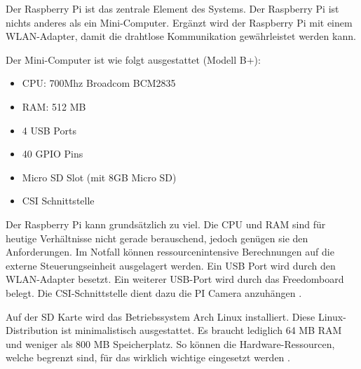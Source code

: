 Der Raspberry Pi ist das zentrale Element des Systems. Der Raspberry Pi ist nichts anderes als ein Mini-Computer. Ergänzt wird der Raspberry Pi mit einem WLAN-Adapter, damit die drahtlose Kommunikation gewährleistet werden kann.

Der Mini-Computer ist wie folgt ausgestattet (Modell B+):
\begin{itemize}
	\item CPU: 700Mhz Broadcom BCM2835
	\item RAM: 512 MB
	\item 4 USB Ports
	\item 40 GPIO Pins
	\item Micro SD Slot (mit 8GB Micro SD)
	\item CSI Schnittstelle
\end{itemize}

Der Raspberry Pi kann grundsätzlich zu viel. Die CPU und RAM sind für heutige Verhältnisse nicht gerade berauschend, jedoch genügen sie den Anforderungen. Im Notfall können ressourcenintensive Berechnungen auf die externe Steuerungseinheit ausgelagert werden. Ein USB Port wird durch den WLAN-Adapter besetzt. Ein weiterer USB-Port wird durch das Freedomboard belegt. Die CSI-Schnittstelle dient dazu die PI Camera anzuhängen \cite{raspberri-b-plus-spec}.

Auf der SD Karte wird das Betriebssystem Arch Linux installiert. Diese Linux-Distribution ist minimalistisch ausgestattet. Es braucht lediglich 64 MB RAM und weniger als 800 MB Speicherplatz. So können die Hardware-Ressourcen, welche begrenzt sind, für das wirklich wichtige eingesetzt werden \cite{arch-linux-system-requirements}.
